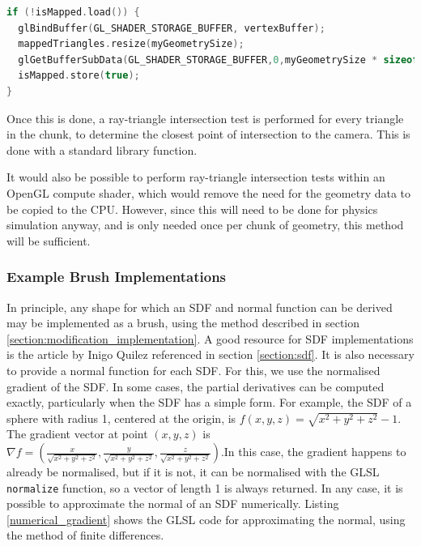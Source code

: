 \documentclass{article}
\begin{document}
\begin{lstlisting}[language=C++,label={mapgeometry},caption={Snippet from the procedure \texttt{mapGeometry} to copy geometry data for a chunk from the GPU to the CPU, to be stored in the array \texttt{mappedTriangles}. \texttt{isMapped} is an atomic boolean storing whether \texttt{mapGeometry} has already been called for this chunk.}]
if (!isMapped.load()) {
  glBindBuffer(GL_SHADER_STORAGE_BUFFER, vertexBuffer);
  mappedTriangles.resize(myGeometrySize);
  glGetBufferSubData(GL_SHADER_STORAGE_BUFFER,0,myGeometrySize * sizeof(glm::vec4),mappedTriangles.data());
  isMapped.store(true);
}
\end{lstlisting}

Once this is done, a ray-triangle intersection test is performed for every triangle in the chunk, to determine the closest point of intersection to the camera. This is done with a standard library function. 

It would also be possible to perform ray-triangle intersection tests within an OpenGL compute shader, which would remove the need for the geometry data to be copied to the CPU. However, since this will need to be done for physics simulation anyway, and is only needed once per chunk of geometry, this method will be sufficient.
\subsubsection{Example Brush Implementations}
In principle, any shape for which an SDF and normal function can be derived may be implemented as a brush, using the method described in section \ref{section:modification_implementation}. A good resource for SDF implementations is the article by Inigo Quilez referenced in section \ref{section:sdf}\cite{quilez:sdf}. It is also necessary to provide a normal function for each SDF. For this, we use the normalised gradient of the SDF. In some cases, the partial derivatives can be computed exactly, particularly when the SDF has a simple form. For example, the SDF of a sphere with radius 1, centered at the origin, is $f\left(x,y,z\right) = \sqrt{x^2+y^2+z^2}-1$. The gradient vector at point $\left(x,y,z\right)$ is $\nabla f = \left(\frac{x}{\sqrt{x^2+y^2+z^2}},\frac{y}{\sqrt{x^2+y^2+z^2}},\frac{z}{\sqrt{x^2+y^2+z^2}}\right)$.In this case, the gradient happens to already be normalised, but if it is not, it can be normalised with the GLSL \texttt{normalize} function, so a vector of length 1 is always returned. In any case, it is possible to approximate the normal of an SDF numerically. Listing \ref{numerical_gradient} shows the GLSL code for approximating the normal, using the method of finite differences.
\end{document}
